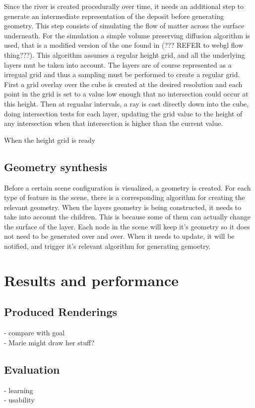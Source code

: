 \documentclass[a4paper,10pt]{article}
\begin{document}
Since the river is created procedurally over time, it needs an additional step to generate an intermediate representation of the deposit before generating geometry. This step consists of simulating the flow of matter across the surface underneath. For the simulation a simple volume preserving diffusion algorithm is used, that is a modified version of the one found in (??? REFER to webgl flow thing???). This algorithm assumes a regular height grid, and all the underlying layers mut be taken into account. The layers are of course represented as a irregual grid and thus a sampling must be performed to create a regular grid. First a grid overlay over the cube is created at the desired resolution and each point in the grid is set to a value low enough that no intersection could occur at this height. Then at regualar intervals, a ray is cast directly down into the cube, doing intersection tests for each layer, updating the grid value to the height of any intersection when that intersection is higher than the current value.

When the height grid is ready



\subsection{Geometry synthesis}
Before a certain scene configuration is visualized, a geometry is created. For each type of feature in the scene, there is a corresponding algorithm for creating the relevant geometry. When the layers geometry is being constructed, it needs to take into account the children. This is because some of them can actually change the surface of the layer. Each node in the scene will keep it's geometry so it does not need to be generated over and over. When it needs to update, it will be notified, and trigger it's relevant algorithm for generating gemoetry.




\section{Results and performance}
\subsection{Produced Renderings}
- compare with goal\\
- Marie might draw her stuff?
\subsection{Evaluation}
- learning\\
- usability
\end{document}
